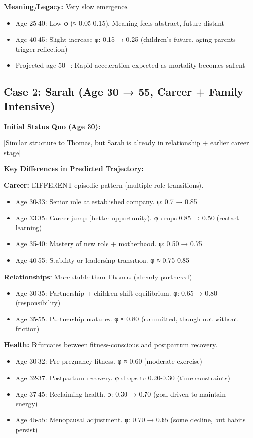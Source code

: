 {{\textbf{Meaning/Legacy:} Very slow emergence.
\begin{itemize}[nosep]
\item Age 25-40: Low φ (≈ 0.05-0.15). Meaning feels abstract, future-distant
\item Age 40-45: Slight increase φ: 0.15 → 0.25 (children's future, aging parents trigger reflection)
\item Projected age 50+: Rapid acceleration expected as mortality becomes salient
\end{itemize}

\subsection{Case 2: Sarah (Age 30 → 55, Career + Family Intensive)}

\textbf{Initial Status Quo (Age 30):}

[Similar structure to Thomas, but Sarah is already in relationship + earlier career stage]

\textbf{Key Differences in Predicted Trajectory:}

\textbf{Career:} DIFFERENT episodic pattern (multiple role transitions).
\begin{itemize}[nosep]
\item Age 30-33: Senior role at established company. φ: 0.7 → 0.85
\item Age 33-35: Career jump (better opportunity). φ drops 0.85 → 0.50 (restart learning)
\item Age 35-40: Mastery of new role + motherhood. φ: 0.50 → 0.75
\item Age 40-55: Stability or leadership transition. φ ≈ 0.75-0.85
\end{itemize}

\textbf{Relationships:} More stable than Thomas (already partnered).
\begin{itemize}[nosep]
\item Age 30-35: Partnership + children shift equilibrium. φ: 0.65 → 0.80 (responsibility)
\item Age 35-55: Partnership matures. φ ≈ 0.80 (committed, though not without friction)
\end{itemize}

\textbf{Health:} Bifurcates between fitness-conscious and postpartum recovery.
\begin{itemize}[nosep]
\item Age 30-32: Pre-pregnancy fitness. φ ≈ 0.60 (moderate exercise)
\item Age 32-37: Postpartum recovery. φ drops to 0.20-0.30 (time constraints)
\item Age 37-45: Reclaiming health. φ: 0.30 → 0.70 (goal-driven to maintain energy)
\item Age 45-55: Menopausal adjustment. φ: 0.70 → 0.65 (some decline, but habits persist)
\end{itemize}

}}
